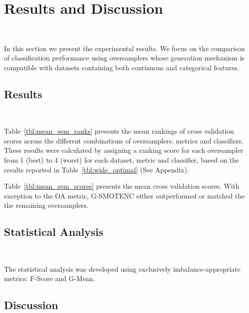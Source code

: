 \documentclass[parskip=full]{scrartcl}
\begin{document}
\section{Results and Discussion}~\label{sec:results_and_discussion}

In this section we present the experimental results. We focus on the
comparison of classification performance using oversamplers whose generation
mechanism is compatible with datasets containing both continuous and
categorical features.


\subsection{Results}~\label{sec:results}

Table~\ref{tbl:mean_sem_ranks} presents the mean rankings of cross validation
scores across the different combinations of oversamplers, metrics and
classifiers. These results were calculated by assigning a ranking score for
each oversampler from 1 (best) to 4 (worst) for each dataset, metric and
classifier, based on the results reported in Table~\ref{tbl:wide_optimal} (See
Appendix).



Table~\ref{tbl:mean_sem_scores} presents the mean cross validation scores.
With exception to the OA metric, G-SMOTENC either outperformed or matched the
the remaining oversamplers.



\subsection{Statistical Analysis}~\label{sec:statistical_analysis}

The statistical analysis was developed using exclusively imbalance-appropriate
metrics: F-Score and G-Mean. 







\subsection{Discussion}~\label{sec:discussion}
\end{document}
